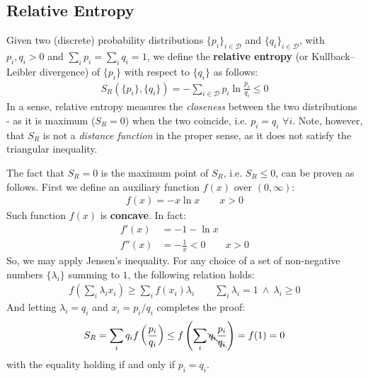 \documentclass[../../main.tex]{subfiles}
\begin{document}
\subsection{Relative Entropy}
Given two (discrete) probability distributions $\{p_i\}_{i \in \mathcal{D}}$ and $\{q_i\}_{i \in \mathcal{D}}$, with $p_i, q_i > 0$ and $\sum_i p_i = \sum_i q_i = 1$, we define the \textbf{relative entropy} (or Kullback–Leibler divergence) of $\{p_i\}$ with respect to $\{q_i\}$ as follows:
\begin{align}
    S_R(\{p_i\}, \{q_i\}) = -\sum_{i \in \mathcal{D}} p_i \ln \frac{p_i}{q_i} \leq 0 \label{eqn:relative-entropy}
\end{align}  
In a sense, relative entropy measures the \textit{closeness} between the two distributions - as it is maximum ($S_R=0$) when the two coincide, i.e. $p_i = q_i$ $\forall i$. Note, however, that $S_R$ is not a \textit{distance function} in the proper sense, as it does not satisfy the triangular inequality. 

\medskip

The fact that $S_R=0$ is the maximum point of $S_R$, i.e. $S_R \leq 0$, can be proven as follows. First we define an auxiliary function $f(x)$ over $(0,\infty)$:
\begin{align*}
    f(x) = -x \ln x \qquad x > 0
\end{align*}
Such function $f(x)$ is \textbf{concave}. In fact: 
\begin{align*}
    f'(x) &= -1 - \ln x\\
    f''(x) &= -\frac{1}{x}  < 0 \qquad x > 0
\end{align*}
So, we may apply Jensen's inequality. For any choice of a set of non-negative numbers $\{\lambda_i\}$ summing to $1$, the following relation holds: %
\begin{align*}
    f\left(\sum_i \lambda_i x_i\right) \geq \sum_i f(x_i) \lambda_i \qquad \sum_i \lambda_i = 1 \> \land \> \lambda_i \geq 0
\end{align*}
And letting $\lambda_i = q_i$ and $x_i = p_i / q_i$ completes the proof:
\begin{align*}
    S_R = \sum_i q_i f\left(\frac{p_i}{q_i} \right) \leq f\left(\sum_i \bcancel{q_i} \frac{p_i}{\bcancel{q_i}} \right) = f(1) = 0
\end{align*}
with the equality holding if and only if $p_i = q_i$.
\end{document}

